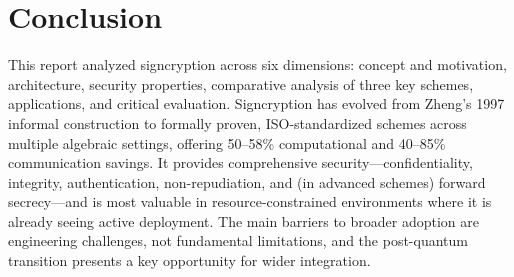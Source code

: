 \documentclass[11pt,a4paper]{article}
\begin{document}
\section{Conclusion}

This report analyzed signcryption across six dimensions: concept and motivation, architecture, security properties, comparative analysis of three key schemes, applications, and critical evaluation. Signcryption has evolved from Zheng's 1997 informal construction to formally proven, ISO-standardized schemes across multiple algebraic settings, offering 50--58\% computational and 40--85\% communication savings. It provides comprehensive security---confidentiality, integrity, authentication, non-repudiation, and (in advanced schemes) forward secrecy---and is most valuable in resource-constrained environments where it is already seeing active deployment. The main barriers to broader adoption are engineering challenges, not fundamental limitations, and the post-quantum transition presents a key opportunity for wider integration.
\end{document}
